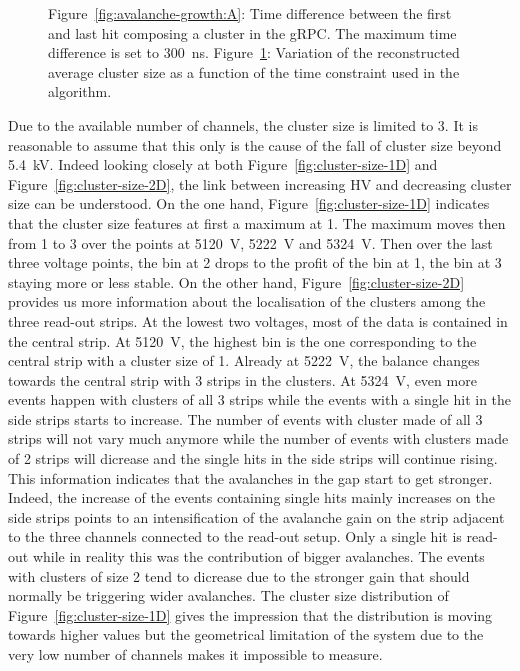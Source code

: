 \begin{figure}[H]
\begin{subfigure}{.5\linewidth}
			\caption{\label{fig:avalanche-growth:B}}
		\end{subfigure}
		\caption{\label{fig:avalanche-growth} Figure~\ref{fig:avalanche-growth:A}: Time difference between the first and last hit composing a cluster in the gRPC. The maximum time difference is set to \SI{300}{ns}. Figure~\ref{fig:avalanche-growth:B}: Variation of the reconstructed average cluster size as a function of the time constraint used in the algorithm.}
	\end{figure}
	
	Due to the available number of channels, the cluster size is limited to 3. It is reasonable to assume that this only is the cause of the fall of cluster size beyond \SI{5.4}{kV}. Indeed looking closely at both Figure~\ref{fig:cluster-size-1D} and Figure~\ref{fig:cluster-size-2D}, the link between increasing HV and decreasing cluster size can be understood. On the one hand, Figure~\ref{fig:cluster-size-1D} indicates that the cluster size features at first a maximum at 1. The maximum moves then from 1 to 3 over the points at \SI{5120}{V}, \SI{5222}{V} and \SI{5324}{V}. Then over the last three voltage points, the bin at 2 drops to the profit of the bin at 1, the bin at 3 staying more or less stable. On the other hand, Figure~\ref{fig:cluster-size-2D} provides us more information about the localisation of the clusters among the three read-out strips. At the lowest two voltages, most of the data is contained in the central strip. At \SI{5120}{V}, the highest bin is the one corresponding to the central strip with a cluster size of 1. Already at \SI{5222}{V}, the balance changes towards the central strip with 3 strips in the clusters. At \SI{5324}{V}, even more events happen with clusters of all 3 strips while the events with a single hit in the side strips starts to increase. The number of events with cluster made of all 3 strips will not vary much anymore while the number of events with clusters made of 2 strips will dicrease and the single hits in the side strips will continue rising. This information indicates that the avalanches in the gap start to get stronger. Indeed, the increase of the events containing single hits mainly increases on the side strips points to an intensification of the avalanche gain on the strip adjacent to the three channels connected to the read-out setup. Only a single hit is read-out while in reality this was the contribution of bigger avalanches. The events with clusters of size 2 tend to dicrease due to the stronger gain that should normally be triggering wider avalanches. The cluster size distribution of Figure~\ref{fig:cluster-size-1D} gives the impression that the distribution is moving towards higher values but the geometrical limitation of the system due to the very low number of channels makes it impossible to measure.
	
